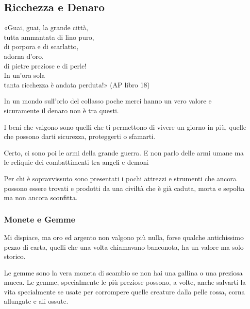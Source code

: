 \documentclass[12pt,a4paper,twoside,openany]{book}
\begin{document}
\begin{multicols}{2}

\subsection{Ricchezza e Denaro}


\begin{changemargin}{0.3cm}{0.3cm}\begin{enfasi}{
«Guai, guai, la grande città,\\
tutta ammantata di lino puro,\\
di porpora e di scarlatto,\\
adorna d’oro,\\
di pietre preziose e di perle!\\
In un’ora sola\\
tanta ricchezza è andata perduta!» (AP libro 18)
}\end{enfasi}\end{changemargin}


	
\label{ricchezza-e-denaro}

In un mondo sull'orlo del collasso poche merci hanno un vero valore e sicuramente il denaro non è tra questi.

I beni che valgono sono quelli che ti permettono di vivere un giorno in più, quelle che possono darti sicurezza, proteggerti o sfamarti.

Certo, ci sono poi le armi della grande guerra. E non parlo delle armi umane ma le reliquie dei combattimenti tra angeli e demoni

Per chi è sopravvissuto sono presentati i pochi attrezzi e strumenti che ancora possono essere trovati e prodotti da una civiltà che è già caduta, morta e sepolta ma non ancora sconfitta.

\subsubsection{Monete e Gemme}

Mi dispiace, ma oro ed argento non valgono più nulla, forse qualche antichissimo pezzo di carta, quelli che una volta chiamavano banconota, ha un valore ma solo storico.

Le gemme sono la vera moneta di scambio se non hai una gallina o una preziosa mucca. Le gemme, specialmente le più preziose possono, a volte, anche salvarti la vita specialmente se usate per corrompere quelle creature dalla pelle rossa, corna allungate e ali ossute.


\end{multicols}
\end{document}
